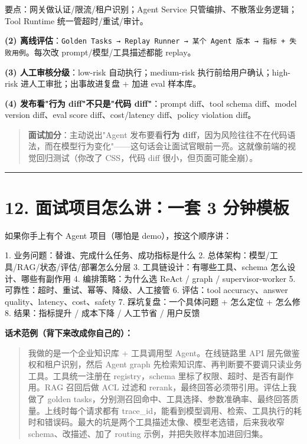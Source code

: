 要点：网关做认证/限流/租户识别；Agent Service 只管编排、不散落业务逻辑；Tool Runtime 统一管超时/重试/审计。

\textbf{(2) 离线评估}：\texttt{Golden Tasks → Replay Runner → 某个 Agent 版本 → 指标 + 失败用例}。每次改 prompt/模型/工具描述都能 replay。

\textbf{(3) 人工审核分级}：low-risk 自动执行；medium-risk 执行前给用户确认；high-risk 进人工审批；出事故进复盘 + 加进 eval 样本库。

\textbf{(4) 发布看"行为 diff"不只是"代码 diff"}：prompt diff、tool schema diff、model version diff、eval score diff、cost/latency diff、policy violation diff。

\begin{quote}
 \textbf{面试加分}：主动说出"Agent 发布要看\textbf{行为 diff}，因为风险往往不在代码语法，而在模型行为变化"——这句话会让面试官眼前一亮。这就像前端的视觉回归测试（你改了 CSS，代码 diff 很小，但页面可能全崩）。
\end{quote}

\bigskip\hrule\bigskip

\section{12. 面试项目怎么讲：一套 3 分钟模板}

如果你手上有个 Agent 项目（哪怕是 demo），按这个顺序讲：

\begin{codeblock}
1. 业务问题：替谁、完成什么任务、成功指标是什么
2. 总体架构：模型/工具/RAG/状态/评估/部署怎么分层
3. 工具链设计：有哪些工具、schema 怎么设计、哪些有副作用
4. 编排策略：为什么选 ReAct / graph / supervisor-worker
5. 可靠性：超时、重试、幂等、降级、人工接管
6. 评估：tool accuracy、answer quality、latency、cost、safety
7. 踩坑复盘：一个具体问题 + 怎么定位 + 怎么修
8. 结果：指标提升 / 成本下降 / 人工节省 / 用户反馈
\end{codeblock}

\textbf{话术范例（背下来改成你自己的）：}

\begin{quote}
我做的是一个企业知识库 + 工具调用型 Agent。在线链路里 API 层先做鉴权和租户识别，然后 Agent graph 先检索知识库、再判断要不要调只读业务工具。工具统一注册在 registry，schema 里标了权限、超时、是否有副作用。RAG 召回后做 ACL 过滤和 rerank，最终回答必须带引用。评估上我做了 golden tasks，分别测召回命中、工具选择、参数准确率、最终回答质量。上线时每个请求都有 trace\_id，能看到模型调用、检索、工具执行的耗时和错误码。最大的坑是两个工具描述太像、模型老选错，后来我收窄 schema、改描述、加了 routing 示例，并把失败样本加进回归集。
\end{quote}

